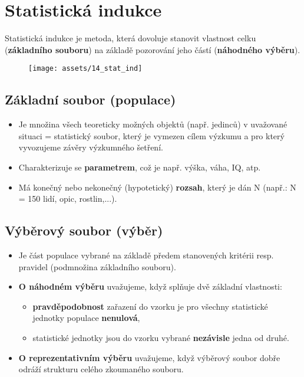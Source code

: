 
\section{Statistická indukce}
Statistická indukce je metoda, která dovoluje stanovit vlastnost celku (\textbf{základního souboru}) na základě pozorování jeho částí (\textbf{náhodného výběru}).
\begin{figure}[H]
    \centering
    \texttt{[image: assets/14\_stat\_ind]}
\end{figure}

\subsection{Základní soubor (populace)}
\begin{itemize}
    \item Je množina všech teoreticky možných objektů (např. jedinců) v uvažované situaci = statistický soubor, který je vymezen cílem výzkumu a pro který vyvozujeme závěry výzkumného šetření.
    \item Charakterizuje se \textbf{parametrem}, což je např. výška, váha, IQ, atp.
    \item Má konečný nebo nekonečný (hypotetický) \textbf{rozsah}, který je dán N (např.: N = 150 lidí, opic, rostlin,...).
\end{itemize}
\subsection{Výběrový soubor (výběr)}
\begin{itemize}
    \item Je část populace vybrané na základě předem stanovených kritérii resp. pravidel (podmnožina základního souboru).
    \item \textbf{O náhodném výběru} uvažujeme, když splňuje dvě základní vlastnosti:
          \begin{itemize}
              \item \textbf{pravděpodobnost} zařazení do vzorku je pro všechny statistické jednotky populace \textbf{nenulová},
              \item statistické jednotky jsou do vzorku vybrané \textbf{nezávisle} jedna od druhé.
          \end{itemize}
    \item \textbf{O reprezentativním výběru} uvažujeme, když výběrový soubor dobře odráží strukturu celého zkoumaného souboru.
\end{itemize}
